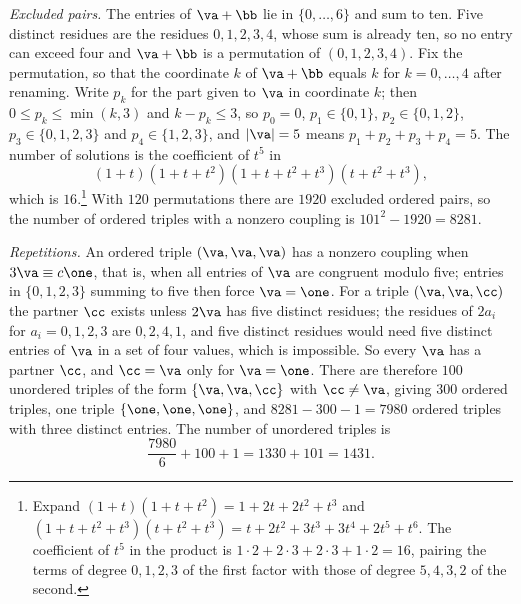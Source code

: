 \emph{Excluded pairs.} The entries of $\va+\bb$ lie in $\{0,\dots,6\}$ and
sum to ten. Five distinct residues are the residues $0,1,2,3,4$, whose sum
is already ten, so no entry can exceed four and $\va+\bb$ is a permutation
of $(0,1,2,3,4)$. Fix the permutation, so that the coordinate $k$ of
$\va+\bb$ equals $k$ for $k=0,\dots,4$ after renaming. Write $p_k$ for the
part given to $\va$ in coordinate $k$; then $0\le p_k\le\min(k,3)$ and
$k-p_k\le3$, so $p_0=0$, $p_1\in\{0,1\}$, $p_2\in\{0,1,2\}$,
$p_3\in\{0,1,2,3\}$ and $p_4\in\{1,2,3\}$, and $|\va|=5$ means
$p_1+p_2+p_3+p_4=5$. The number of solutions is the coefficient of $t^5$ in
\[
(1+t)(1+t+t^2)(1+t+t^2+t^3)(t+t^2+t^3),
\]
which is $16$.\footnote{Expand $(1+t)(1+t+t^2)=1+2t+2t^2+t^3$ and
$(1+t+t^2+t^3)(t+t^2+t^3)=t+2t^2+3t^3+3t^4+2t^5+t^6$. The coefficient of
$t^5$ in the product is $1\cdot2+2\cdot3+2\cdot3+1\cdot2=16$, pairing the
terms of degree $0,1,2,3$ of the first factor with those of degree
$5,4,3,2$ of the second.} With $120$ permutations there are $1920$
excluded ordered pairs, so the number of ordered triples with a nonzero
coupling is $101^2-1920=8281$.

\emph{Repetitions.} An ordered triple $(\va,\va,\va)$ has a nonzero coupling
when $3\va\equiv c\one$, that is, when all entries of $\va$ are congruent
modulo five; entries in $\{0,1,2,3\}$ summing to five then force
$\va=\one$. For a triple $(\va,\va,\cc)$ the partner $\cc$ exists unless
$2\va$ has five distinct residues; the residues of $2a_i$ for
$a_i=0,1,2,3$ are $0,2,4,1$, and five distinct residues would need five
distinct entries of $\va$ in a set of four values, which is impossible. So
every $\va$ has a partner $\cc$, and $\cc=\va$ only for $\va=\one$. There
are therefore $100$ unordered triples of the form $\{\va,\va,\cc\}$ with
$\cc\ne\va$, giving $300$ ordered triples, one triple $\{\one,\one,\one\}$,
and $8281-300-1=7980$ ordered triples with three distinct entries. The
number of unordered triples is
\[
\frac{7980}{6}+100+1=1330+101=1431.
\]

